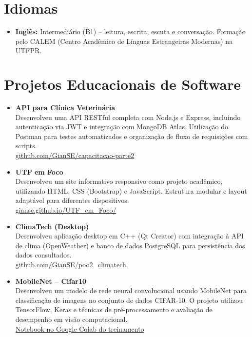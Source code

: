\documentclass[a4paper,10pt]{article}
\begin{document}
\section*{Idiomas}
\begin{itemize}[leftmargin=*]
    \item \textbf{Inglês:} Intermediário (B1) – leitura, escrita, escuta e conversação. Formação pelo CALEM (Centro Acadêmico de Línguas Estrangeiras Modernas) na UTFPR.
\end{itemize}

\section*{Projetos Educacionais de Software}
\begin{itemize}[leftmargin=*]
    \item \textbf{API para Clínica Veterinária}\\
    Desenvolveu uma API RESTful completa com Node.js e Express, incluindo autenticação via JWT e integração com MongoDB Atlas. Utilização do Postman para testes automatizados e organização de fluxo de requisições com scripts.\\
    \href{https://github.com/GianSE/capacitacao-parte2}{github.com/GianSE/capacitacao-parte2}

    \item \textbf{UTF em Foco}\\
    Desenvolveu um site informativo responsivo como projeto acadêmico, utilizando HTML, CSS (Bootstrap) e JavaScript. Estrutura modular e layout adaptável para diferentes dispositivos.\\
    \href{https://gianse.github.io/UTF_em_Foco/}{gianse.github.io/UTF_em_Foco/}

    \item \textbf{ClimaTech (Desktop)}\\
    Desenvolveu aplicação desktop em C++ (Qt Creator) com integração à API de clima (OpenWeather) e banco de dados PostgreSQL para persistência dos dados consultados.\\
    \href{https://github.com/GianSE/poo2_climatech}{github.com/GianSE/poo2_climatech}

    \item \textbf{MobileNet – Cifar10}\\
    Desenvolveu um modelo de rede neural convolucional usando MobileNet para classificação de imagens no conjunto de dados CIFAR-10. O projeto utilizou TensorFlow, Keras e técnicas de pré-processamento e avaliação de desempenho em visão computacional.\\
    \href{https://colab.research.google.com/drive/1AGP831WCSEpkeN7zi-tSyno52o2E8LfE}{Notebook no Google Colab do treinamento}


\end{itemize}
\end{document}
